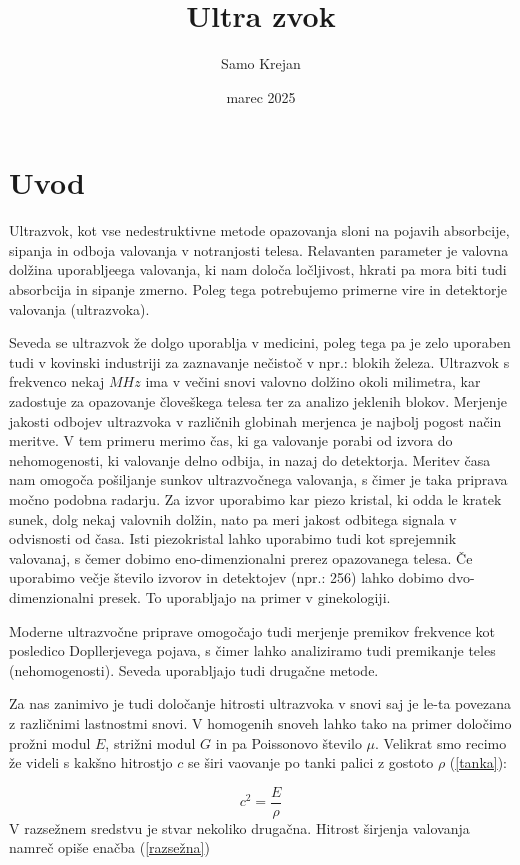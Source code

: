 \documentclass[12pt]{article}
\title{\textbf{Ultra zvok}}
\author{Samo Krejan}
\date{marec 2025}
\begin{document}
\maketitle

\section{Uvod}

Ultrazvok, kot vse nedestruktivne metode opazovanja sloni na pojavih absorbcije, sipanja in odboja valovanja v notranjosti telesa. Relavanten parameter je valovna dolžina uporabljeega valovanja, ki nam določa ločljivost, hkrati pa mora biti tudi absorbcija in sipanje zmerno. Poleg tega potrebujemo primerne vire in detektorje valovanja (ultrazvoka).

Seveda se ultrazvok že dolgo uporablja v medicini, poleg tega pa je zelo uporaben tudi v kovinski industriji za zaznavanje nečistoč v npr.: blokih železa. Ultrazvok s frekvenco nekaj $MHz$ ima v večini snovi valovno dolžino okoli milimetra, kar zadostuje za opazovanje človeškega telesa ter za analizo jeklenih blokov. Merjenje jakosti odbojev ultrazvoka v različnih globinah merjenca je najbolj pogost način meritve. V tem primeru merimo čas, ki ga valovanje porabi od izvora do nehomogenosti, ki valovanje delno odbija, in nazaj do detektorja. Meritev časa nam omogoča pošiljanje sunkov ultrazvočnega valovanja, s čimer je taka priprava močno podobna radarju. Za izvor uporabimo kar piezo kristal, ki odda le kratek sunek, dolg nekaj valovnih dolžin, nato pa meri jakost odbitega signala v odvisnosti od časa. Isti piezokristal lahko uporabimo tudi kot sprejemnik valovanaj, s čemer dobimo eno-dimenzionalni prerez opazovanega telesa. Če uporabimo večje število izvorov in detektojev (npr.: 256) lahko dobimo dvo-dimenzionalni presek. To uporabljajo na primer v ginekologiji.

Moderne ultrazvočne priprave omogočajo tudi merjenje premikov frekvence kot posledico Dopllerjevega pojava, s čimer lahko analiziramo tudi premikanje teles (nehomogenosti). Seveda uporabljajo tudi drugačne metode.

Za nas zanimivo je tudi določanje hitrosti ultrazvoka v snovi saj je le-ta povezana z različnimi lastnostmi snovi. V homogenih snoveh lahko tako na primer določimo prožni modul $E$, strižni modul $G$ in pa Poissonovo število $\mu$. Velikrat smo recimo že videli s kakšno hitrostjo $c$ se širi vaovanje po tanki palici z gostoto $\rho$ (\ref{tanka}):

\begin{equation}
    c^{2} = \frac{E}{\rho}
    \label{tanka}
\end{equation}
V razsežnem sredstvu je stvar nekoliko drugačna. Hitrost širjenja valovanja namreč opiše enačba (\ref{razsežna})
\end{document}
